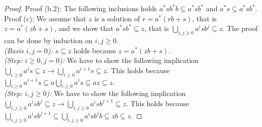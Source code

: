 \begin{theorem}
\begin{proof}
		Proof (b.2): The following inclusions holds 
		$a^{*}sb^{*}b\subseteq a^{*}sb^{*}$ and $a^{*}s\subseteq a^{*}sb^{*}$.\\
		
		Proof (c): We assume that $z$ is a solution of $r=a^{*}(rb+s)$, that is $z=a^{*}(zb+s)$, and we show that $a^{*}sb^{*}\subseteq z$,
		that is $\bigcup_{i,j\geq0}a^{i}sb^{j}\subseteq z$. The proof can be done by induction on $i,j\geq0$.\\
		\textsl{(Basis $i,j=0$):} $s\subseteq z$ holds because
		$z=a^{*}(zb+s)$.\\
		\textsl{(Step: $i\geq0,j=0$):} We have to show the following implication
		$\bigcup_{i\geq0}a^{i}s\subseteq z\rightarrow\bigcup_{i\geq0}a^{i+1}s\subseteq z$.
		This holds because $\bigcup_{i\geq0}a^{i+1}s\subseteq a\bigcup_{i\geq0}a^{i}s\subseteq az\subseteq z$.
		\\
		\textsl{(Step: $i,j\geq0$):} We have to show the following implication
		$\bigcup_{i,j\geq0}a^{i}sb^{j}\subseteq z\rightarrow\bigcup_{i,j\geq0}a^{i}sb^{j+1}\subseteq z$.
		This holds because $\bigcup_{i,j\geq0}a^{i}sb^{j+1}\subseteq\bigcup_{i,j\geq0}a^{i}sb^{j}b\subseteq zb\subseteq z$.
	\end{proof}
\end{theorem}